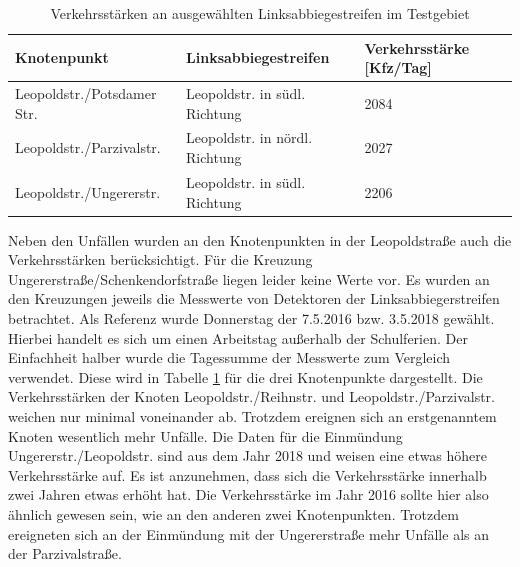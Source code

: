 \begin{table}[htpb]
	\scriptsize
	\caption[Verkehrsstärken an ausgewählten Linksabbiegestreifen im Testgebiet]{Verkehrsstärken an ausgewählten Linksabbiegestreifen im Testgebiet}\label{tab:Linksabbieger}
	\centering
	\begin{tabular}{l p{3cm} p{3cm} }
		\toprule
		Knotenpunkt & Linksabbiegestreifen & Verkehrsstärke [Kfz/Tag] \\
		\midrule
		Leopoldstr./Potsdamer Str. & Leopoldstr. in südl. Richtung & 2084 \\
		Leopoldstr./Parzivalstr. & Leopoldstr. in nördl. Richtung & 2027 \\
		Leopoldstr./Ungererstr. & Leopoldstr. in südl. Richtung & 2206 \\
		\bottomrule
	\end{tabular}
\end{table}

Neben den Unfällen wurden an den Knotenpunkten in der Leopoldstraße auch die Verkehrsstärken berücksichtigt. Für die Kreuzung Ungererstraße/Schenkendorfstraße liegen leider keine Werte vor. Es wurden an den Kreuzungen jeweils die Messwerte von Detektoren der Linksabbiegerstreifen betrachtet. Als Referenz wurde Donnerstag der 7.5.2016 bzw. 3.5.2018 gewählt. Hierbei handelt es sich um einen Arbeitstag außerhalb der Schulferien. Der Einfachheit halber wurde die Tagessumme der Messwerte zum Vergleich verwendet. Diese wird in Tabelle \ref{tab:Linksabbieger} für die drei Knotenpunkte dargestellt. Die Verkehrsstärken der Knoten Leopoldstr./Reihnstr. und Leopoldstr./Parzivalstr. weichen nur minimal voneinander ab. Trotzdem ereignen sich an erstgenanntem Knoten wesentlich mehr Unfälle. Die Daten für die Einmündung Ungererstr./Leopoldstr. sind aus dem Jahr 2018 und weisen eine etwas höhere Verkehrsstärke auf. Es ist anzunehmen, dass sich die Verkehrsstärke innerhalb zwei Jahren etwas erhöht hat. Die Verkehrsstärke im Jahr 2016 sollte hier also ähnlich gewesen sein, wie an den anderen zwei Knotenpunkten. Trotzdem ereigneten sich an der Einmündung mit der Ungererstraße mehr Unfälle als an der Parzivalstraße. 

